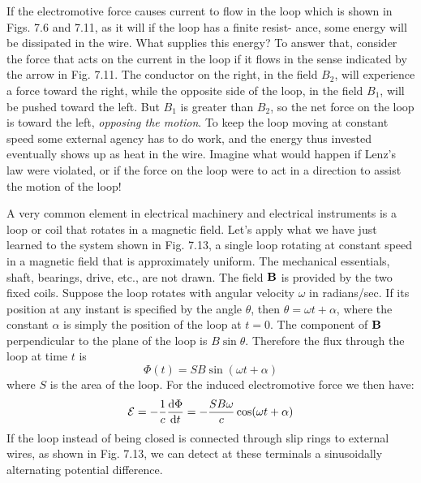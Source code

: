 If the electromotive force causes current to flow in the loop which
is shown in Figs. 7.6 and 7.11, as it will if the loop has a finite resist-
ance, some energy will be dissipated in the wire. What supplies this
energy? To answer that, consider the force that acts on the current
in the loop if it flows in the sense indicated by the arrow in Fig. 7.11.
The conductor on the right, in the field $B_2$, will experience a force
toward the right, while the opposite side of the loop, in the field $B_1$,
will be pushed toward the left. But $B_1$ is greater than $B_2$, so the net
force on the loop is toward the left, \emph{opposing the motion}. To keep
the loop moving at constant speed some external agency has to do
work, and the energy thus invested eventually shows up as heat in
the wire. Imagine what would happen if Lenz's law were violated,
or if the force on the loop were to act in a direction to assist the
motion of the loop!

A very common element in electrical machinery and electrical instruments
is a loop or coil that rotates in a magnetic field. Let's apply
what we have just learned to the system shown in Fig. 7.13, a single
loop rotating at constant speed in a magnetic field that is approximately
uniform. The mechanical essentials, shaft, bearings, drive,
etc., are not drawn. The field $\mathbf{B}$ is provided by the two fixed coils.
Suppose the loop rotates with angular velocity $\omega$ in radians/sec. If
its position at any instant is specified by the angle $\theta$, then $\theta=\omega t +\alpha$,
where the constant $\alpha$ is simply the position of the loop at $t = 0$. The
component of $\mathbf{B}$ perpendicular to the plane of the loop is $B \sin \theta$.
Therefore the flux through the loop at time $t$ is
\begin{equation}
  \Phi(t) = SB\sin(\omega t+\alpha)
\end{equation}
where $S$ is the area of the loop. For the induced electromotive force
we then have: 
\begin{equation}
  \mathcal{E} = -\frac{1}{c}\frac{\textup{d}\Phi}{\textup{d} t} = -\frac{SB\omega}{c} \cos(\omega t+\alpha)
\end{equation}
If the loop instead of being closed is connected through slip rings to
external wires, as shown in Fig. 7.13, we can detect at these terminals
a sinusoidally alternating potential difference.

